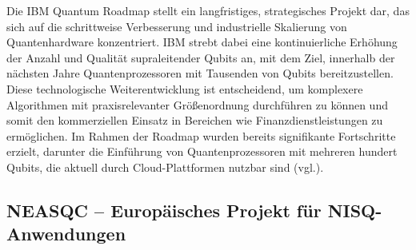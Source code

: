 Die IBM Quantum Roadmap stellt ein langfristiges, strategisches Projekt dar, das sich auf die schrittweise Verbesserung und industrielle Skalierung von Quantenhardware konzentriert. IBM strebt dabei eine kontinuierliche Erhöhung der Anzahl und Qualität supraleitender Qubits an, mit dem Ziel, innerhalb der nächsten Jahre Quantenprozessoren mit Tausenden von Qubits bereitzustellen. Diese technologische Weiterentwicklung ist entscheidend, um komplexere Algorithmen mit praxisrelevanter Größenordnung durchführen zu können und somit den kommerziellen Einsatz in Bereichen wie Finanzdienstleistungen zu ermöglichen. Im Rahmen der Roadmap wurden bereits signifikante Fortschritte erzielt, darunter die Einführung von Quantenprozessoren mit mehreren hundert Qubits, die aktuell durch Cloud-Plattformen nutzbar sind (vgl.\cite{IBM Quantum, 2023}).

\subsection{NEASQC – Europäisches Projekt für NISQ-Anwendungen}

